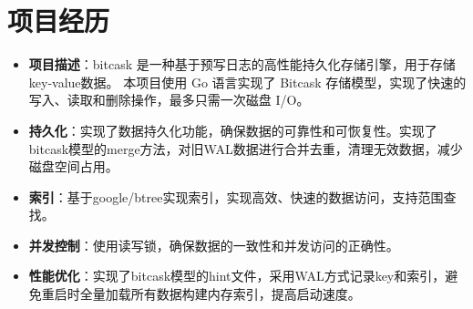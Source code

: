\documentclass{resume}
\begin{document}



\section{项目经历}

\begin{itemize}
    \item \textbf{项目描述}：bitcask 是一种基于预写日志的高性能持久化存储引擎，用于存储key-value数据。
    本项目使用 Go 语言实现了 Bitcask 存储模型，实现了快速的写入、读取和删除操作，最多只需一次磁盘 I/O。
    \item \textbf{持久化}：实现了数据持久化功能，确保数据的可靠性和可恢复性。实现了bitcask模型的merge方法，对旧WAL数据进行合并去重，清理无效数据，减少磁盘空间占用。
    \item \textbf{索引}：基于google/btree实现索引，实现高效、快速的数据访问，支持范围查找。
    \item \textbf{并发控制}：使用读写锁，确保数据的一致性和并发访问的正确性。
    \item \textbf{性能优化}：实现了bitcask模型的hint文件，采用WAL方式记录key和索引，避免重启时全量加载所有数据构建内存索引，提高启动速度。
\end{itemize}
\end{document}

